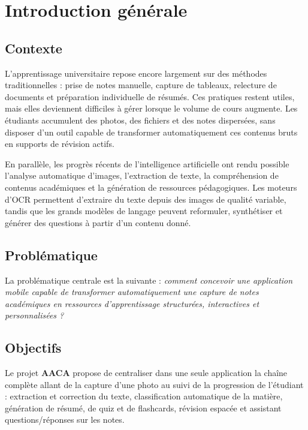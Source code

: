 \documentclass[12pt,a4paper]{report}
\begin{document}
\chapter*{Introduction générale}

\section*{Contexte}

L'apprentissage universitaire repose encore largement sur des méthodes traditionnelles : prise de notes manuelle, capture de tableaux, relecture de documents et préparation individuelle de résumés. Ces pratiques restent utiles, mais elles deviennent difficiles à gérer lorsque le volume de cours augmente. Les étudiants accumulent des photos, des fichiers et des notes dispersées, sans disposer d'un outil capable de transformer automatiquement ces contenus bruts en supports de révision actifs.

En parallèle, les progrès récents de l'intelligence artificielle ont rendu possible l'analyse automatique d'images, l'extraction de texte, la compréhension de contenus académiques et la génération de ressources pédagogiques. Les moteurs d'OCR permettent d'extraire du texte depuis des images de qualité variable, tandis que les grands modèles de langage peuvent reformuler, synthétiser et générer des questions à partir d'un contenu donné.

\section*{Problématique}

La problématique centrale est la suivante : \textit{comment concevoir une application mobile capable de transformer automatiquement une capture de notes académiques en ressources d'apprentissage structurées, interactives et personnalisées ?}

\section*{Objectifs}

Le projet \textbf{AACA} propose de centraliser dans une seule application la chaîne complète allant de la capture d'une photo au suivi de la progression de l'étudiant : extraction et correction du texte, classification automatique de la matière, génération de résumé, de quiz et de flashcards, révision espacée et assistant questions/réponses sur les notes.
\end{document}
